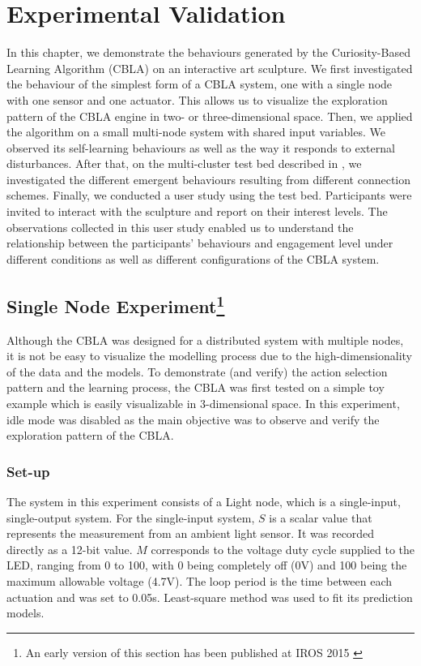 \chapter{Experimental Validation} \label{chap:validations}

In this chapter, we demonstrate the behaviours generated by the Curiosity-Based Learning Algorithm (CBLA) on an interactive art sculpture. We first investigated the behaviour of the simplest form of a CBLA system, one with a single node with one sensor and one actuator. This allows us to visualize the exploration pattern of the CBLA engine in two- or three-dimensional space. Then, we applied the algorithm on a small multi-node system with shared input variables. We observed its self-learning behaviours as well as the way it responds to external disturbances. After that, on the multi-cluster test bed described in , we investigated the different emergent behaviours resulting from different connection schemes. Finally, we conducted a user study using the test bed. Participants were invited to interact with the sculpture and report on their interest levels. The observations collected in this user study enabled us to understand the relationship between the participants' behaviours and engagement level under different conditions as well as different configurations of the CBLA system.


\section[Single Node Experiment]{Single Node Experiment\footnote{An early version of this section has been published at IROS 2015 \cite{Chan2015} }}\label{sec:single-node}

Although the CBLA was designed for a distributed system with multiple nodes, it is not be easy to visualize the modelling process due to the high-dimensionality of the data and the models. To demonstrate (and verify) the action selection pattern and the learning process, the CBLA was first tested on a simple toy example which is easily visualizable in 3-dimensional space. In this experiment, idle mode was disabled as the main objective was to observe and verify the exploration pattern of the CBLA. 

\subsection{Set-up}
The system in this experiment consists of a Light node, which is a single-input, single-output system. For the single-input system, $S$ is a scalar value that represents the measurement from an ambient light sensor. It was recorded directly as a 12-bit value. $M$ corresponds to the voltage duty cycle supplied to the LED, ranging from 0 to 100, with 0 being completely off (0V) and 100 being the maximum allowable voltage (4.7V). The loop period is the time between each actuation and was set to 0.05s. Least-square method was used to fit its prediction models.


